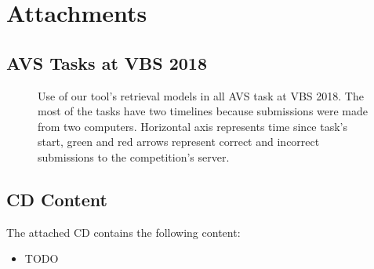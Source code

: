 \chapter{Attachments}

\section{AVS Tasks at VBS 2018}\label{att:vbs_tasks_timeline_avs}

\begin{figure}[h]
	\centering
	
	
	\caption[Use of tool's retrieval models in AVS tasks]{Use of our tool's retrieval models in all AVS task at VBS 2018. The most of the tasks have two timelines because submissions were made from two computers. Horizontal axis represents time since task's start, green and red arrows represent correct and incorrect submissions to the competition's server.}
	\label{fig:vbs_tasks_timeline_avs}
\end{figure}

\section{CD Content}\label{att:cd}
The attached CD contains the following content:
\begin{itemize}
	\item TODO
\end{itemize}
